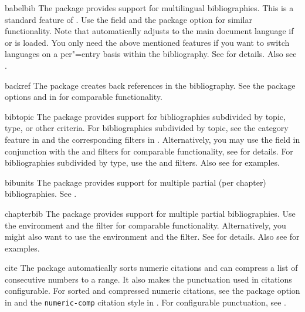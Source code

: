 \documentclass{ltxdockit}[2011/03/25]
\newcommand*{\biblatex}{\sty{biblatex}\xspace}
\begin{document}
\begin{marglist}

\item[babelbib]
The  package provides support for multilingual bibliographies. This is a standard feature of \biblatex. Use the  field and the package option  for similar functionality. Note that \biblatex automatically adjusts to the main document language if  or  is loaded. You only need the above mentioned features if you want to switch languages on a per"=entry basis within the bibliography. See  for details. Also see .

\item[backref]
The  package creates back references in the bibliography. See the package options  and  in  for comparable functionality.

\item[bibtopic]
The  package provides support for bibliographies subdivided by topic, type, or other criteria. For bibliographies subdivided by topic, see the category feature in  and the corresponding filters in . Alternatively, you may use the  field in conjunction with the  and  filters for comparable functionality, see  for details. For bibliographies subdivided by type, use the  and  filters. Also see  for examples.

\item[bibunits]
The  package provides support for multiple partial (\eg per chapter) bibliographies. See .

\item[chapterbib]
The  package provides support for multiple partial bibliographies. Use the  environment and the  filter for comparable functionality. Alternatively, you might also want to use the  environment and the  filter. See  for details. Also see  for examples.

\item[cite]
The  package automatically sorts numeric citations and can compress a list of consecutive numbers to a range. It also makes the punctuation used in citations configurable. For sorted and compressed numeric citations, see the  package option in  and the \texttt{numeric-comp} citation style in . For configurable punctuation, see .


\end{marglist}
\end{document}
